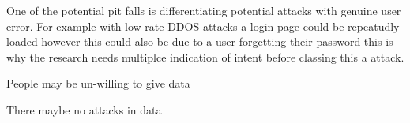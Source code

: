 One of the potential pit falls is differentiating potential attacks with genuine user error. For example with low rate DDOS attacks a login page could be repeatudly loaded however this could also be due to a user forgetting their password this is why the research needs multiplce indication of intent before classing this a attack.  

People may be un-willing to give data

There maybe no attacks in data

